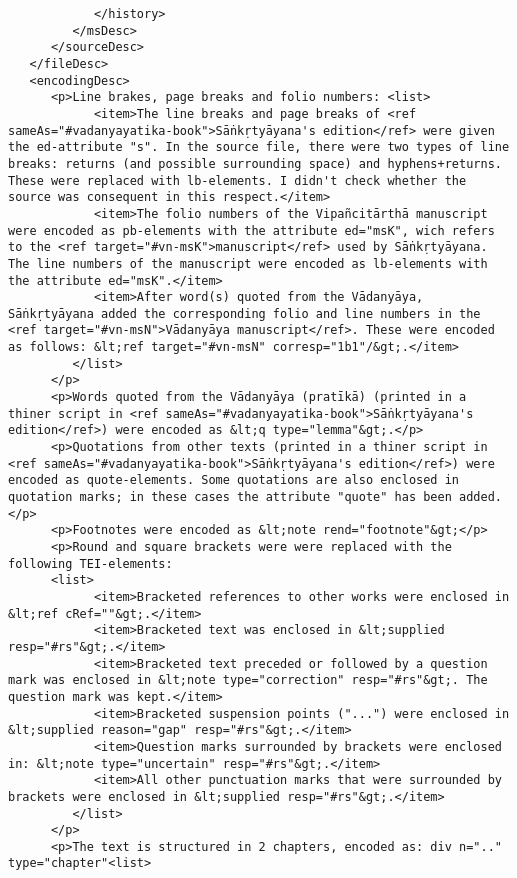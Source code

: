 \documentclass[article,12pt,a4paper]{memoir}%
\begin{document}
\begin{verbatim}
            </history>
         </msDesc>
      </sourceDesc>
   </fileDesc>
   <encodingDesc>
      <p>Line brakes, page breaks and folio numbers: <list>
            <item>The line breaks and page breaks of <ref sameAs="#vadanyayatika-book">Sāṅkṛtyāyana's edition</ref> were given the ed-attribute "s". In the source file, there were two types of line breaks: returns (and possible surrounding space) and hyphens+returns. These were replaced with lb-elements. I didn't check whether the source was consequent in this respect.</item>
            <item>The folio numbers of the Vipañcitārthā manuscript were encoded as pb-elements with the attribute ed="msK", wich refers to the <ref target="#vn-msK">manuscript</ref> used by Sāṅkṛtyāyana. The line numbers of the manuscript were encoded as lb-elements with the attribute ed="msK".</item>
            <item>After word(s) quoted from the Vādanyāya, Sāṅkṛtyāyana added the corresponding folio and line numbers in the <ref target="#vn-msN">Vādanyāya manuscript</ref>. These were encoded as follows: &lt;ref target="#vn-msN" corresp="1b1"/&gt;.</item>
         </list>
      </p>
      <p>Words quoted from the Vādanyāya (pratīkā) (printed in a thiner script in <ref sameAs="#vadanyayatika-book">Sāṅkṛtyāyana's edition</ref>) were encoded as &lt;q type="lemma"&gt;.</p>
      <p>Quotations from other texts (printed in a thiner script in <ref sameAs="#vadanyayatika-book">Sāṅkṛtyāyana's edition</ref>) were encoded as quote-elements. Some quotations are also enclosed in quotation marks; in these cases the attribute "quote" has been added.</p>
      <p>Footnotes were encoded as &lt;note rend="footnote"&gt;</p>
      <p>Round and square brackets were were replaced with the following TEI-elements:
      <list>
            <item>Bracketed references to other works were enclosed in &lt;ref cRef=""&gt;.</item>
            <item>Bracketed text was enclosed in &lt;supplied resp="#rs"&gt;.</item>
            <item>Bracketed text preceded or followed by a question mark was enclosed in &lt;note type="correction" resp="#rs"&gt;. The question mark was kept.</item>
            <item>Bracketed suspension points ("...") were enclosed in &lt;supplied reason="gap" resp="#rs"&gt;.</item>
            <item>Question marks surrounded by brackets were enclosed in: &lt;note type="uncertain" resp="#rs"&gt;.</item>
            <item>All other punctuation marks that were surrounded by brackets were enclosed in &lt;supplied resp="#rs"&gt;.</item>
         </list>
      </p>
      <p>The text is structured in 2 chapters, encoded as: div n=".." type="chapter"<list>

\end{verbatim}
\end{document}
